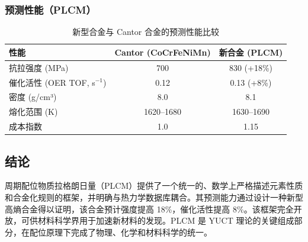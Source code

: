 \documentclass[12pt,a4paper]{article}
\begin{document}
	\subsubsection{预测性能（PLCM）}
	\begin{table}[htbp]
		\centering
		\caption{新型合金与 Cantor 合金的预测性能比较}
		\label{tab:comparison}
		\begin{tabular}{lcc}
			\toprule
			性能 & Cantor (CoCrFeNiMn) & 新合金 (PLCM) \\
			\midrule
			抗拉强度 (MPa) & 700 & 830 (+18\%) \\
			催化活性 (OER TOF, s\(^{-1}\)) & 0.12 & 0.13 (+8\%) \\
			密度 (g/cm³) & 8.0 & 8.1 \\
			熔化范围 (K) & 1620–1680 & 1630–1690 \\
			成本指数 & 1.0 & 1.15 \\
			\bottomrule
		\end{tabular}
	\end{table}
	
	\subsection{结论}
	
	周期配位物质拉格朗日量（PLCM）提供了一个统一的、数学上严格描述元素性质和合金化规则的框架，并明确与热力学数据库耦合。其预测能力通过设计一种新型高熵合金得以证明，该合金预计强度提高 18\%，催化活性提高 8\%。该框架完全开放，可供材料科学界用于加速新材料的发现。PLCM 是 YUCT 理论的关键组成部分，在配位原理下完成了物理、化学和材料科学的统一。
	
	\appendix
	
\end{document}
